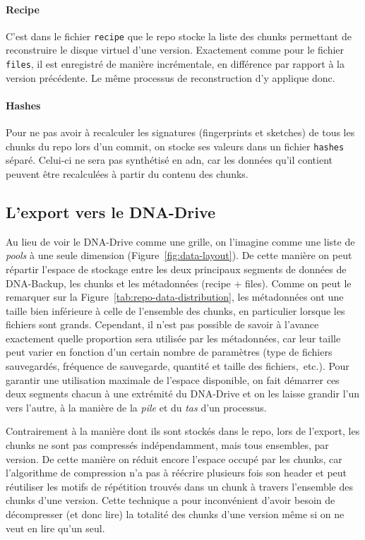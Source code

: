 \documentclass[a4paper]{report}
\begin{document}
\paragraph{Recipe}
C'est dans le fichier \verb|recipe| que le repo stocke la liste des chunks
permettant de reconstruire le disque virtuel d'une version.
Exactement comme pour le fichier \verb|files|, il est enregistré de manière incrémentale,
en différence par rapport à la version précédente.
Le même processus de reconstruction d'y applique donc.

\paragraph{Hashes}
Pour ne pas avoir à recalculer les signatures (fingerprints et sketches) de tous les chunks du repo lors d'un commit,
on stocke ses valeurs dans un fichier \verb|hashes| séparé.
Celui-ci ne sera pas synthétisé en \ac{adn},
car les données qu'il contient peuvent être recalculées à partir du contenu des chunks.


\subsection{L'export vers le DNA-Drive}
\label{sec:dna-export}

Au lieu de voir le DNA-Drive comme une grille,
on l'imagine comme une liste de \emph{pools} à une seule dimension (Figure~\ref{fig:data-layout}).
De cette manière on peut répartir l'espace de stockage
entre les deux principaux segments de données de DNA-Backup,
les chunks et les métadonnées (recipe + files).
Comme on peut le remarquer sur la Figure~\ref{tab:repo-data-distribution},
les métadonnées ont une taille bien inférieure à celle de l'ensemble des chunks,
en particulier lorsque les fichiers sont grands.
Cependant, il n'est pas possible de savoir à l'avance exactement
quelle proportion sera utilisée par les métadonnées,
car leur taille peut varier en fonction d'un certain nombre de paramètres
(type de fichiers sauvegardés, fréquence de sauvegarde, quantité et taille des fichiers,~etc.).
Pour garantir une utilisation maximale de l'espace disponible,
on fait démarrer ces deux segments chacun à une extrémité du DNA-Drive
et on les laisse grandir l'un vers l'autre,
à la manière de la \emph{pile} et du \emph{tas} d'un processus.

Contrairement à la manière dont ils sont stockés dans le repo,
lors de l'export, les chunks ne sont pas compressés indépendamment,
mais tous ensembles, par version.
De cette manière on réduit encore l'espace occupé par les chunks,
car l'algorithme de compression n'a pas à réécrire plusieurs fois son header
et peut réutiliser les motifs de répétition trouvés dans un chunk
à travers l'ensemble des chunks d'une version.
Cette technique a pour inconvénient d'avoir besoin de décompresser (et donc lire)
la totalité des chunks d'une version même si on ne veut en lire qu'un seul.
\end{document}
